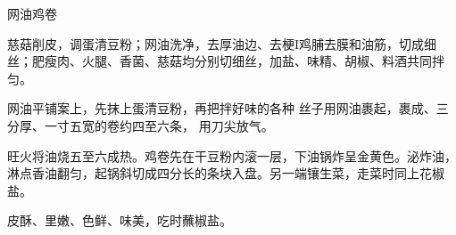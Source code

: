 \begin{recipe}{网油鸡卷}

\ingredients



\cooking

\step 慈菇削皮，调蛋清豆粉；网油洗净，去厚油边、去梗I鸡脯去膜和油筋，切成细丝；肥瘦肉、火腿、香菌、慈菇均分别切细丝，加盐、味精、胡椒、料酒共同拌匀。

网油平铺案上，先抹上蛋清豆粉，再把拌好味的各种 丝子用网油裹起，裹成、三分厚、一寸五宽的卷约四至六条， 用刀尖放气。

\step 旺火将油烧五至六成热。鸡卷先在干豆粉内滚一层，下油锅炸呈金黄色。泌炸油，淋点香油翻匀，起锅斜切成四分长的条块入盘。另一端镶生菜，走菜时同上花椒盐。

\notes

皮酥、里嫩、色鲜、味美，吃时蘸椒盐。

\end{recipe}

